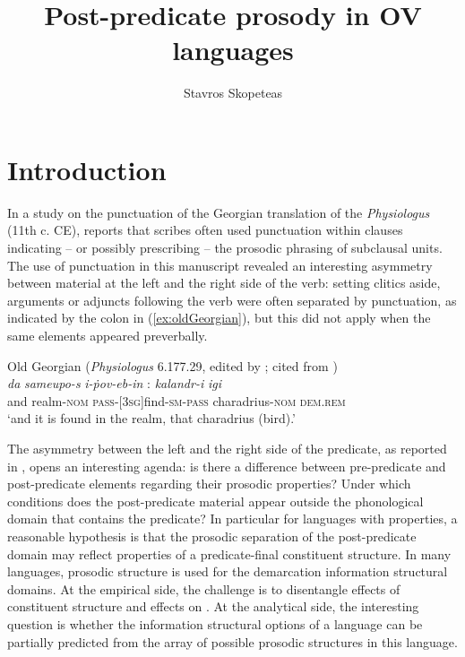\documentclass[output=paper,colorlinks,citecolor=brown]{langscibook}
\author{Stavros Skopeteas\orcid{0000-0002-2827-0518}\affiliation{University of Göttingen}}
\title{Post-predicate prosody in OV languages}
\begin{document}
\maketitle\label{WOWA:ch:3}

\section{Introduction}\label{sec:intro}
In a study on the punctuation of the Georgian translation of the \textit{Physiologus} (11th c. CE), \citet{boeder_phrasing_1991} reports that scribes often used punctuation within clauses indicating – or possibly prescribing – the prosodic phrasing of subclausal units. The use of punctuation in this manuscript revealed an interesting asymmetry between material at the left and the right side of the verb: setting clitics aside, arguments or adjuncts following the verb were often separated by punctuation, as indicated by the colon in (\ref{ex:oldGeorgian}), but this did not apply when the same elements appeared preverbally.


\newpage
\ea \label{ex:oldGeorgian}
    Old Georgian (\textit{Physiologus} 6.177.29, edited by \citealt{marr_fisiolog_1904}; cited from \citealt{boeder_phrasing_1991}) \\
    \gll \textit{da} \textit{sameupo-s} \textit{i-ṗov-eb-in} : \textit{kalandr-i} \textit{igi}\\
    and	realm-\textsc{nom}	\textsc{pass}-[\textsc{3sg}]find-\textsc{sm}-\textsc{pass} {} charadrius-\textsc{nom}	\textsc{dem}.\textsc{rem}\\
\glt `and it is found in the realm, that charadrius (bird).'
\z

\largerpage

The asymmetry between the left and the right side of the predicate, as reported in \citet{boeder_phrasing_1991}, opens an interesting agenda: is there a difference between pre-predicate and post-predicate elements regarding their prosodic properties? Under which conditions does the post-predicate material appear outside the phonological domain that contains the predicate?  In particular for languages with  properties, a reasonable hypothesis is that the prosodic separation of the post-predicate domain may reflect properties of a predicate-final constituent structure. In many languages, prosodic structure is used for the demarcation information structural domains. At the empirical side, the challenge is to disentangle effects of constituent structure and effects on . At the analytical side, the interesting question is whether the information structural options of a language can be partially predicted from the array of possible prosodic structures in this language.
\end{document}
